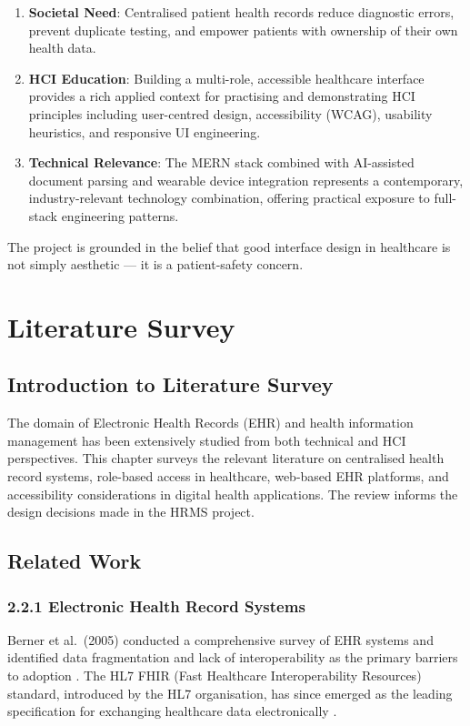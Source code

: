 \documentclass[12pt,a4paper]{report}
\begin{document}
\begin{enumerate}[leftmargin=2cm]
    \item \textbf{Societal Need}: Centralised patient health records reduce diagnostic errors, prevent duplicate testing, and empower patients with ownership of their own health data.
    \item \textbf{HCI Education}: Building a multi-role, accessible healthcare interface provides a rich applied context for practising and demonstrating HCI principles including user-centred design, accessibility (WCAG), usability heuristics, and responsive UI engineering.
    \item \textbf{Technical Relevance}: The MERN stack combined with AI-assisted document parsing and wearable device integration represents a contemporary, industry-relevant technology combination, offering practical exposure to full-stack engineering patterns.
\end{enumerate}

The project is grounded in the belief that good interface design in healthcare is not simply aesthetic — it is a patient-safety concern.

\chapter{Literature Survey}

\section{Introduction to Literature Survey}

The domain of Electronic Health Records (EHR) and health information management has been extensively studied from both technical and HCI perspectives. This chapter surveys the relevant literature on centralised health record systems, role-based access in healthcare, web-based EHR platforms, and accessibility considerations in digital health applications. The review informs the design decisions made in the HRMS project.

\section{Related Work}

\subsection{2.2.1 Electronic Health Record Systems}
Berner et al.\ (2005) conducted a comprehensive survey of EHR systems and identified data fragmentation and lack of interoperability as the primary barriers to adoption \cite{berner2005}. The HL7 FHIR (Fast Healthcare Interoperability Resources) standard, introduced by the HL7 organisation, has since emerged as the leading specification for exchanging healthcare data electronically \cite{hl7fhir}.
\end{document}
